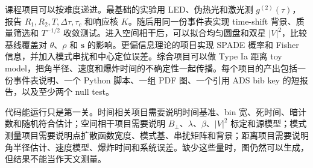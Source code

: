 课程项目可以按难度递进。最基础的实验用 LED、伪热光和激光测 \(g^{(2)}(\tau)\)，报告 \(R_1,R_2,T,\Delta\tau,\tau_c\) 和响应核 \(K\)。随后用同一份事件表实现 time-shift 背景、质量筛选和 \(T^{-1/2}\) 收敛测试。进入空间相干后，可以拟合均匀圆盘和双星 \(|V|^2\)，比较基线覆盖对 \(\theta\)、\(\rho\) 和 \(\boldsymbol s\) 的影响。更偏信息理论的项目实现 SPADE 概率和 Fisher 信息，并加入模式串扰和中心定位误差。综合项目可以做 Type Ia 距离 toy model，把角半径、速度和爆炸时间的不确定性一起传播。每个项目的产出包括一份事件表说明、一个 Python 脚本、一组 PDF 图、一个引用 ADS bib key 的短报告，以及至少两个 null test。

代码能运行只是第一关。时间相关项目需要说明时间基准、bin 宽、死时间、暗计数和随机符合估计；空间相干项目需要说明 \(B_\perp\)、\(\lambda\)、\(\beta\)、\(|V|^2\) 标定和源模型；模式测量项目需要说明点扩散函数宽度、模式基、串扰矩阵和背景；距离项目需要说明角半径估计、速度模型、爆炸时间和系统误差。缺少这些量时，图仍然可以生成，但结果不能当作天文测量。

